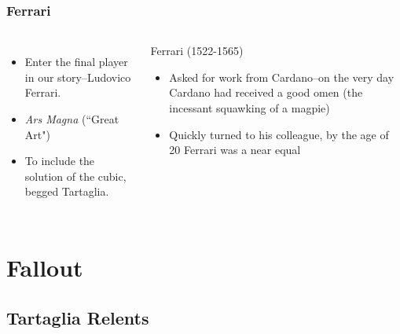 \documentclass{beamer}
\begin{document}

\begin{frame}
\frametitle{Ferrari}
\begin{columns}[c]
\vfill
\begin{itemize}
    \item
    Enter the final player in our story--Ludovico Ferrari.
    
    \vspace{8mm}

    \item 
    {\it Ars Magna} (``Great Art")

    \vspace{8mm}

    \item
    To include the solution of the cubic, begged Tartaglia.
\end{itemize}


\begin{block}{Ferrari (1522-1565)}
\begin{itemize}
    \item Asked for work from Cardano--on the very day Cardano had
    received a good omen (the incessant squawking of a magpie)
    
    \item Quickly turned to his colleague, by the age of 20 Ferrari was
    a near equal
\end{itemize}
\end{block}

\end{columns}
\end{frame}


\section{Fallout}
\subsection{Tartaglia Relents}
\end{document}
